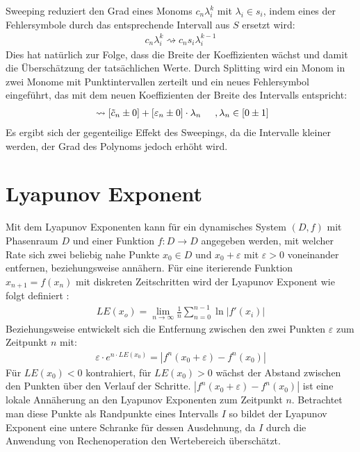 Sweeping reduziert den Grad eines Monoms $c_n \lambda_i^k$ mit $\lambda_i \in s_i$, indem eines der Fehlersymbole durch das entsprechende Intervall aus $S$ ersetzt wird: 
\begin{align*}
 c_n \lambda_i^k \rightsquigarrow c_n s_i \lambda_i^{k-1}
\end{align*}
Dies hat natürlich zur Folge, dass die Breite der Koeffizienten wächst und damit die Überschätzung der tatsächlichen Werte. Durch Splitting wird ein Monom in zwei Monome mit Punktintervallen zerteilt und ein neues Fehlersymbol eingeführt, das mit dem neuen Koeffizienten der Breite des Intervalls entspricht:
\begin{align*}
 [\tilde{c}_n \pm \varepsilon_n]\ \rightsquigarrow [\tilde{c}_n \pm 0] + [\varepsilon_n \pm 0]\cdot  \lambda_n \hspace{0.5cm}, \lambda_n \in [0 \pm 1]
\end{align*}
Es ergibt sich der gegenteilige Effekt des Sweepings, da die Intervalle kleiner werden, der Grad des Polynoms jedoch erhöht wird.





\section{Lyapunov Exponent}
Mit dem Lyapunov Exponenten kann für ein dynamisches System $(D,f)$ mit Phasenraum $D$ und einer Funktion $f: D \rightarrow D$ angegeben werden, mit welcher Rate sich zwei beliebig nahe Punkte $x_0 \in D$ und $x_0 + \varepsilon$ mit $\varepsilon > 0$ voneinander entfernen, beziehungsweise annähern. Für eine iterierende Funktion $x_{n+1} = f(x_n)$ mit diskreten Zeitschritten wird der Lyapunov Exponent wie folgt definiert \cite{Plaschko1989}:
\begin{align}
 LE(x_o) = \lim_{n \rightarrow \infty} \frac{1}{n} \sum_{n=0}^{n-1} \ln |f'(x_i)|
\end{align}
Beziehungsweise entwickelt sich die Entfernung zwischen den zwei Punkten $\varepsilon$ zum Zeitpunkt $n$ mit:
\begin{align}
\label{distance}
 \varepsilon \cdot e^{n\cdot LE(x_0)} = |f^n(x_0 + \varepsilon) - f^n(x_0)|
\end{align}
Für $LE(x_0)<0$ kontrahiert, für $LE(x_0)>0$ wächst der Abstand zwischen den Punkten über den Verlauf der Schritte. $|f^n(x_0 + \varepsilon) - f^n(x_0)|$ ist eine lokale Annäherung an den Lyapunov Exponenten zum Zeitpunkt $n$. Betrachtet man diese Punkte als Randpunkte eines Intervalls $I$ so bildet der Lyapunov Exponent eine untere Schranke für dessen Ausdehnung, da $I$ durch die Anwendung von Rechenoperation den Wertebereich überschätzt.

